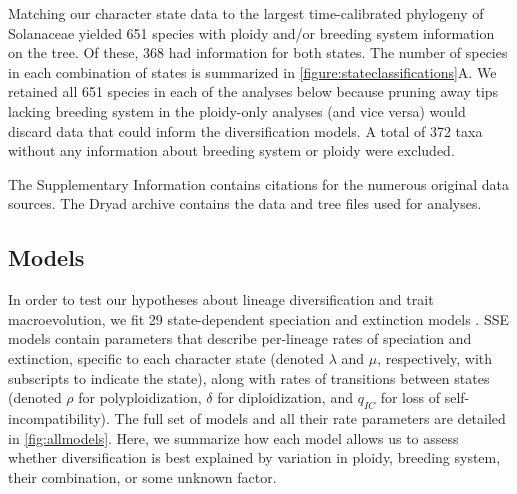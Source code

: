 Matching our character state data to the largest time-calibrated phylogeny of Solanaceae \citep{sarkinen_2013} yielded 651 species with ploidy and/or breeding system information on the tree.
Of these, 368 had information for both states.
The number of species in each combination of states is summarized in \cref{figure:stateclassifications}A.
We retained all 651 species in each of the analyses below because pruning away tips lacking breeding system in the ploidy-only analyses (and vice versa) would discard data that could inform the diversification models.
A total of 372 taxa without any information about breeding system or ploidy were excluded.

The Supplementary Information contains citations for the numerous original data sources. %
The Dryad archive contains the data and tree files used for analyses. %

\subsection{Models}

In order to test our hypotheses about lineage diversification and trait macroevolution, we fit 29 state-dependent speciation and extinction models \citep[BiSSE, MuSSE, HiSSE;][]{maddison_2007, fitzjohn_2012, beaulieu_2016}.
SSE models contain parameters that describe per-lineage rates of speciation and extinction, specific to each character state (denoted $\lambda$ and $\mu$, respectively, with subscripts to indicate the state), along with rates of transitions between states (denoted $\rho$ for polyploidization, $\delta$ for diploidization, and $q_{IC}$ for loss of self-incompatibility).
The full set of models and all their rate parameters are detailed in \cref{fig:allmodels}.
Here, we summarize how each model allows us to assess whether diversification is best explained by variation in ploidy, breeding system, their combination, or some unknown factor.

